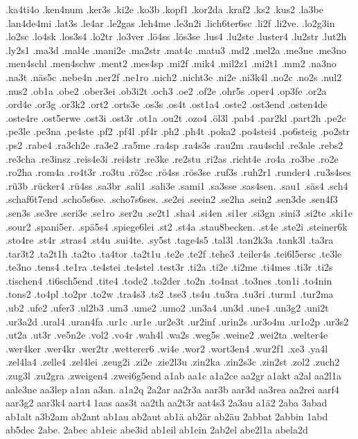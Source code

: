 {.ka4ti4o
.ken4num
.ker3s
.ki2e
.ko3b
.kopf1
.kor2da
.kraf2
.ks2
.kus2
.la3be
.lan4de4mi
.lat3s
.le4ar
.le2gas
.leh4me
.le3n2i
.lich6ter6sc
.li2f
.li2ve.
.lo2g3in
.lo2sc
.lo4sk
.los3s4
.lo2tr
.lo3ver
.lö4ss
.lös3se
.lus4
.lu2ste
.luster4
.lu2str
.lut2h
.ly2s1
.ma3d
.mal4e
.mani2e
.ma2str
.mat4c
.matu3
.md2
.mel2a
.me3ne
.me3no
.men4schl
.men4schw
.ment2
.mes4sp
.mi2f
.mik4
.mil2z1
.mi2t1
.mm2
.na3no
.na3t
.näs5c
.nebe4n
.ner2f
.ne1ro
.nich2
.nicht3e
.ni2e
.ni3k4l
.no2c
.no2s
.nul2
.nus2
.ob1a
.obe2
.ober3ei
.ob3i2t
.och3
.oe2
.of2e
.ohr5s
.oper4
.op3fe
.or2a
.ord4e
.or3g
.or3k2
.ort2
.orts3e
.os3s
.os4t
.ost1a4
.oste2
.ost3end
.osten4de
.oste4re
.ost5erwe
.ost3i
.ost3r
.ot1a
.ou2t
.ozo4
.öl3l
.pab4
.par2kl
.part2h
.pe2c
.pe3le
.pe3na
.pe4ste
.pf2
.pf4l
.pf4r
.ph2
.ph4t
.poka2
.po4stei4
.po6steig
.po2str
.ps2
.rabe4
.ra3ch2e
.ra3e2
.ra5me
.ra4sp
.ra4s3s
.rau2m
.rau4schl
.re3ale
.rebs2
.re3cha
.re3insz
.reis4e3i
.rei4str
.re3ke
.re2stu
.ri2as
.richt4e
.ro4a
.ro3be
.ro2e
.ro2ha
.rom4a
.ro4t3r
.ro3tu
.rö2sc
.rö4ss
.rös3se
.ruf3s
.ruh2r1
.runder4
.ru3s4ses
.rü3b
.rücker4
.rü4ss
.sa3br
.sali1
.sali3e
.sami1
.sa3sse
.sas4sen.
.sau1
.säs4
.sch4
.schaf6t7end
.scho5s6se.
.scho7s6ses.
.se2ei
.seein2
.se2ha
.sein2
.sen3de
.sen4f3
.sen3s
.se3re
.seri3e
.se1ro
.ser2u
.se2t1
.sha4
.si4en
.si1er
.si3gn
.sini3
.si2te
.ski1e
.sour2
.spani5er.
.spä5s4
.spiege6lei
.st2
.st4a
.stau8becken.
.st4e
.ste2i
.steiner6k
.sto4re
.st4r
.stras4
.st4u
.sui4te.
.sy5st
.tage4s5
.tal3l
.tan2k3a
.tank3l
.ta3ra
.tar3t2
.ta2t1h
.ta2to
.ta4tor
.ta2t1u
.te2e
.te2f
.tehe3
.teiler4s
.tei6l5ersc
.te3le
.te3no
.tens4
.te1ra
.te4stei
.te4stel
.test3r
.ti2a
.ti2e
.ti2me
.ti4mes
.ti3r
.ti2s
.tischen4
.ti6sch5end
.tite4
.tode2
.to2der
.to2n
.to4nat
.to3nes
.ton1i
.to4nin
.tons2
.to4pl
.to2pr
.to2w
.tra4s3
.ts2
.tse3
.ts4u
.tu3ra
.tu3ri
.turm1
.tur2ma
.ub2
.ufe2
.ufer3
.ul2b3
.um3
.ume2
.umo2
.un3a4
.un3d
.une4
.un3g2
.uni2t
.ur3a2d
.ural4
.uran4fa
.ur1c
.ur1e
.ur2e3t
.ur2inf
.urin2s
.ur3o4m
.ur1o2p
.ur3s2
.ut2a
.ut3r
.ve5n2e
.vol2
.vo4r
.wah4l
.wa2s
.weg5s
.weine2
.wei2ta
.welter4e
.wer4ker
.wer4kr
.wer2tr
.wetterer6
.wi4e
.wor2
.wort3en4
.wur2f1
.xe3
.ya4l
.zel4la4
.zelle4
.zel4lei
.zeug2i
.zi2e
.zie2l3u
.zin2ka
.zin2s3c
.zin2st
.zol2
.zuch2
.zug3l
.zu2gra
.zweigen4
.zwei6g5end
a1ab
aa1c
a1a2ce
aa2gr
a1akt
a2al
aa2l1a
aale3ne
aa3lep
a1an
a3an.
a1a2q
2a2ar
aa2r3a
aar3b
aar3d
aa3rea
aa2rei
aarf4
aar3g2
aar3k4
aart4
1aas
aas3t
aa2th
aa2t3r
aat4s3
2a3au
a1ä2
2aba
3abad
ab1alt
a3b2am
ab2ant
ab1au
ab2aut
ab1ä
ab2är
ab2äu
2abbat
2abbin
1abd
ab5dec
2abe.
2abec
ab1eic
abe3id
ab1eil
ab1ein
2ab2el
abe2l1a
abela2d
}
